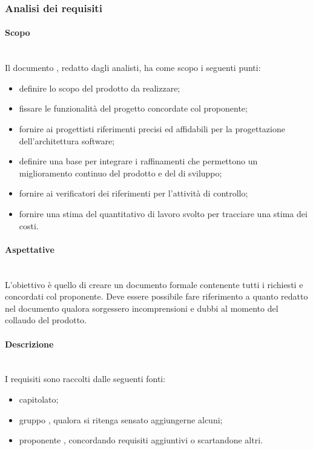 \subsubsection{Analisi dei requisiti}
\paragraph{Scopo}\mbox{}\\
Il documento \AdR{}, redatto dagli analisti, ha come scopo i seguenti punti:
\begin{itemize}
\item definire lo scopo del prodotto da realizzare;
\item fissare le funzionalità del progetto concordate col proponente;
\item fornire ai progettisti riferimenti precisi ed affidabili per la progettazione dell'architettura software;
\item definire una base per integrare i raffinamenti che permettono un miglioramento continuo del prodotto e del  di sviluppo;
\item fornire ai verificatori dei riferimenti per l’attività di controllo;
\item fornire una stima del quantitativo di lavoro svolto per tracciare una stima dei costi. 
\end{itemize}

\paragraph{Aspettative}\mbox{}\\
L'obiettivo è quello di creare un documento formale contenente tutti i  richiesti e concordati col proponente.
Deve essere possibile fare riferimento a quanto redatto nel documento \AdR{} qualora sorgessero incomprensioni e dubbi al momento del collaudo del prodotto.

\paragraph{Descrizione}\mbox{}\\
I requisiti sono raccolti dalle seguenti fonti:
\begin{itemize}
\item capitolato;
\item gruppo \Gruppo{}, qualora si ritenga sensato aggiungerne alcuni;
\item proponente \Proponente{}, concordando requisiti aggiuntivi o scartandone altri.
\end{itemize}

